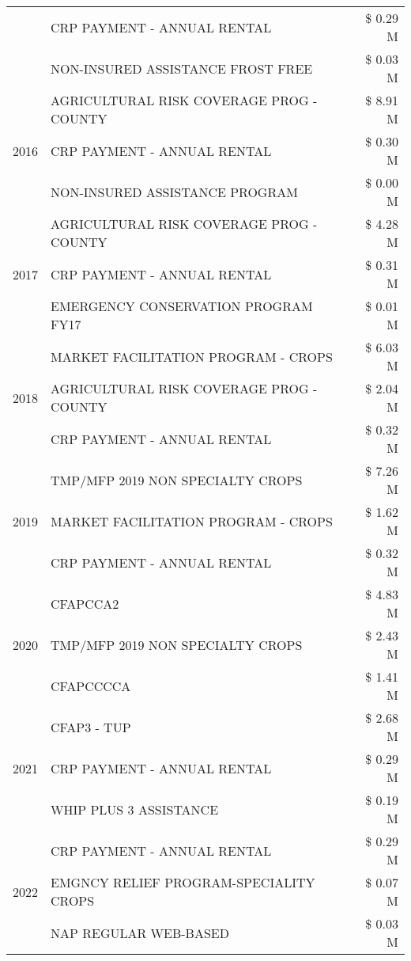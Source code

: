 \begin{tabular}{llr}
 & CRP PAYMENT - ANNUAL RENTAL & \$ 0.29 M \\
 & NON-INSURED ASSISTANCE FROST FREE & \$ 0.03 M \\
\cline{1-3}
\multirow[t]{3}{*}{2016} & AGRICULTURAL RISK COVERAGE PROG - COUNTY & \$ 8.91 M \\
 & CRP PAYMENT - ANNUAL RENTAL & \$ 0.30 M \\
 & NON-INSURED ASSISTANCE PROGRAM & \$ 0.00 M \\
\cline{1-3}
\multirow[t]{3}{*}{2017} & AGRICULTURAL RISK COVERAGE PROG - COUNTY & \$ 4.28 M \\
 & CRP PAYMENT - ANNUAL RENTAL & \$ 0.31 M \\
 & EMERGENCY CONSERVATION PROGRAM FY17 & \$ 0.01 M \\
\cline{1-3}
\multirow[t]{3}{*}{2018} & MARKET FACILITATION PROGRAM - CROPS & \$ 6.03 M \\
 & AGRICULTURAL RISK COVERAGE PROG - COUNTY & \$ 2.04 M \\
 & CRP PAYMENT - ANNUAL RENTAL & \$ 0.32 M \\
\cline{1-3}
\multirow[t]{3}{*}{2019} & TMP/MFP 2019 NON SPECIALTY CROPS & \$ 7.26 M \\
 & MARKET FACILITATION PROGRAM - CROPS & \$ 1.62 M \\
 & CRP PAYMENT - ANNUAL RENTAL & \$ 0.32 M \\
\cline{1-3}
\multirow[t]{3}{*}{2020} & CFAPCCA2 & \$ 4.83 M \\
 & TMP/MFP 2019 NON SPECIALTY CROPS & \$ 2.43 M \\
 & CFAPCCCCA & \$ 1.41 M \\
\cline{1-3}
\multirow[t]{3}{*}{2021} & CFAP3 - TUP & \$ 2.68 M \\
 & CRP PAYMENT - ANNUAL RENTAL & \$ 0.29 M \\
 & WHIP PLUS 3 ASSISTANCE & \$ 0.19 M \\
\cline{1-3}
\multirow[t]{3}{*}{2022} & CRP PAYMENT - ANNUAL RENTAL & \$ 0.29 M \\
 & EMGNCY RELIEF PROGRAM-SPECIALITY CROPS & \$ 0.07 M \\
 & NAP REGULAR WEB-BASED & \$ 0.03 M \\
\cline{1-3}
\bottomrule
\end{tabular}
